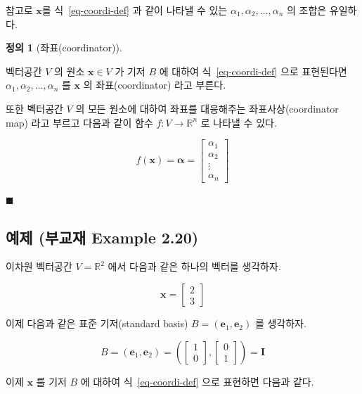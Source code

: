\documentclass[
  11pt,
  a4paper,
  oneside]{scrbook}
\newcommand{\RR}{\mathbb{R}}
\theoremstyle{definition}
\newtheorem{definition}{정의}[chapter]
\theoremstyle{definition}
\theoremstyle{plain}
\theoremstyle{remark}
\begin{document}
참고로 \(\pmb x\)를 식~\ref{eq-coordi-def} 과 같이 나타낼 수 있는
\(\alpha_1,\alpha_2,\dots,\alpha_n\) 의 조합은 유일하다.

\begin{definition}[좌표(coordinator)]\protect\hypertarget{def-coordi}{}\label{def-coordi}

벡터공간 \(V\) 의 원소 \(\pmb x \in V\) 가 기저 \(B\) 에 대하여
식~\ref{eq-coordi-def} 으로 표현된다면
\(\alpha_1,\alpha_2,\dots,\alpha_n\) 를 \(\pmb x\) 의 좌표(coordinator)
라고 부른다.

또한 벡터공간 \(V\) 의 모든 원소에 대하여 좌표를 대응해주는
좌표사상(coordinator map) 라고 부르고 다음과 같이 함수
\(f: V \rightarrow \RR^n\) 로 나타낼 수 있다.

\[ f(\pmb x) = \pmb \alpha =
\begin{bmatrix}
\alpha_1 \\ 
\alpha_2 \\
\vdots \\
\alpha_n
\end{bmatrix}
\]

\(\blacksquare\)

\end{definition}

\subsection{예제 (부교재 Example
2.20)}\label{uxc608uxc81c-uxbd80uxad50uxc7ac-example-2.20}

이차원 벡터공간 \(V = \RR^2\) 에서 다음과 같은 하나의 벡터를 생각하자.

\[
\pmb x =
\begin{bmatrix}
2 \\
3
\end{bmatrix}
\]

이제 다음과 같은 표준 기저(standard basis) \(B = (\pmb e_1, \pmb e_2)\)
를 생각하자.

\[ B=  (\pmb e_1, \pmb e_2) =
\left (
\begin{bmatrix}
1 \\
0
\end{bmatrix}
,
\begin{bmatrix}
0 \\
1
\end{bmatrix}
\right )
= \pmb I
\]

이제 \(\pmb x\) 를 기저 \(B\) 에 대하여 식~\ref{eq-coordi-def} 으로
표현하면 다음과 같다.
\end{document}
